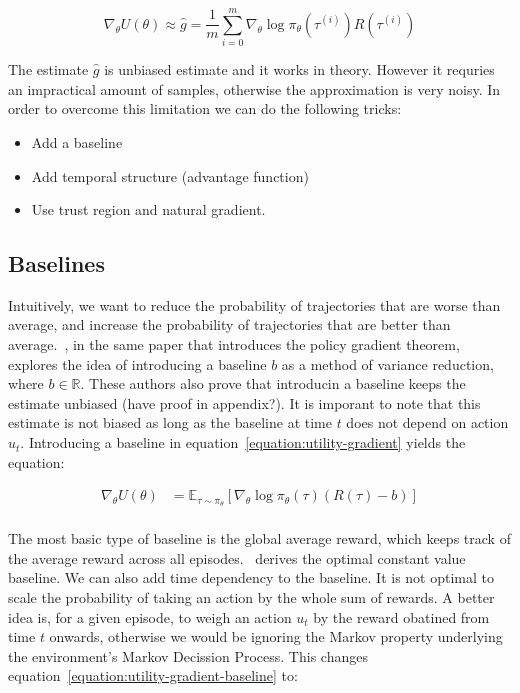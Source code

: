 \documentclass{../main.tex}{}
\begin{document}
\begin{equation}\label{equation:expectance-gradient-vanilla}
\nabla_{\theta}U(\theta) \approx \hat{g} = \frac{1}{m} \sum_{i = 0}^{m} \nabla_{\theta} \log \pi_{\theta}(\tau^{(i)}) R(\tau^{(i)})
\end{equation}

The estimate $\hat{g}$ is unbiased estimate and it works in theory. However it requries an impractical amount of samples, otherwise the approximation is very noisy. In order to overcome this limitation we can do the following tricks:

\begin{itemize}
\item Add a baseline
\item Add temporal structure (advantage function)
\item Use trust region and natural gradient.
\end{itemize}

\subsection{Baselines}
Intuitively, we want to reduce the probability of trajectories that are worse than average, and increase the probability of trajectories that are better than average.~\cite{Williams1992}, in the same paper that introduces the policy gradient theorem, explores the idea of introducing a baseline $b$ as a method of variance reduction, where $b \in \mathbb{R}$. These authors also prove that introducin a baseline keeps the estimate unbiased (have proof in appendix?). It is imporant to note that this estimate is not biased as long as the baseline at time $t$ does not depend on action $u_t$. Introducing a baseline in equation~\ref{equation:utility-gradient} yields the equation:

\begin{equation}\label{equation:utility-gradient-baseline}
\begin{aligned}
\nabla_{\theta} U(\theta) & = \mathbb{E}_{\tau \sim \pi_{\theta}} [\nabla_{\theta} \log \pi_{\theta}(\tau) (R(\tau) - b)] \\
\end{aligned}
\end{equation}

The most basic type of baseline is the global average reward, which keeps track of the average reward across all episodes.~\cite{Greensmith2004} derives the optimal constant value baseline. We can also add time dependency to the baseline. It is not optimal to scale the probability of taking an action by the whole sum of rewards. A better idea is, for a given episode, to weigh an action $u_t$ by the reward obatined from time $t$ onwards, otherwise we would be ignoring the Markov property underlying the environment's Markov Decission Process. This changes equation~\ref{equation:utility-gradient-baseline} to:
\end{document}
